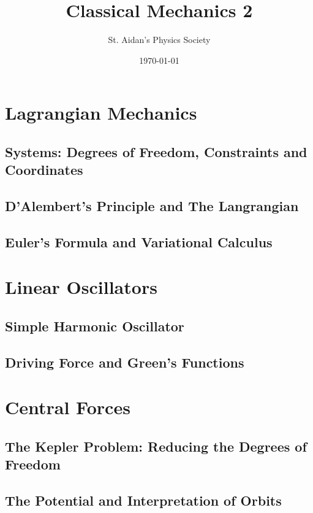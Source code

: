 \documentclass[12pt,%
               a4paper]{physics_notes}
\begin{document}
\title{Classical Mechanics 2}
\author{St. Aidan's Physics Society}
\date{\today}
\maketitle

\tableofcontents
\newpage

\section{Lagrangian Mechanics}
\subsection{Systems: Degrees of Freedom, Constraints and Coordinates}
\subsection{D'Alembert's Principle and The Langrangian}
\subsection{Euler's Formula and Variational Calculus}

\section{Linear Oscillators}
\subsection{Simple Harmonic Oscillator}
\subsection{Driving Force and Green's Functions}

\section{Central Forces}
\subsection{The Kepler Problem: Reducing the Degrees of Freedom}
\subsection{The Potential and Interpretation of Orbits}

 
\end{document}
